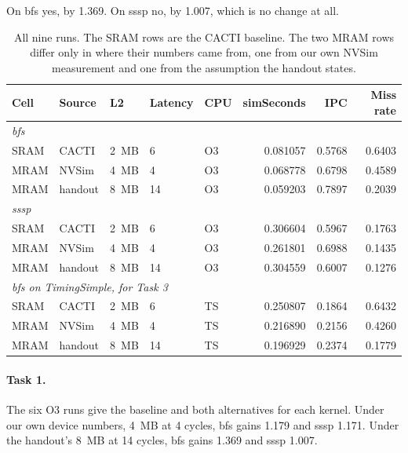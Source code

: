 \documentclass[9pt,a4paper]{extarticle}
\begin{document}
On bfs yes, by \SI{1.369}{\times}. On sssp no, by \SI{1.007}{\times},
which is no change at all.
\begin{table}[!ht]\centering\small
\caption{All nine runs. The SRAM rows are the CACTI baseline. The two MRAM
rows differ only in where their numbers came from, one from our own NVSim
measurement and one from the assumption the handout states.}
\label{tab:e}
\begin{tabular}{|l|l|l|l|l|r|r|r|}
\hline
Cell & Source & L2 & Latency & CPU & simSeconds & IPC & Miss rate \\
\hline
\multicolumn{8}{|l|}{\emph{bfs}} \\
\hline
SRAM & CACTI & \SI{2}{MB} & 6 & O3 & 0.081057 & 0.5768 & 0.6403 \\
\hline
MRAM & NVSim & \SI{4}{MB} & 4 & O3 & 0.068778 & 0.6798 & 0.4589 \\
\hline
MRAM & handout & \SI{8}{MB} & 14 & O3 & 0.059203 & 0.7897 & 0.2039 \\
\hline
\multicolumn{8}{|l|}{\emph{sssp}} \\
\hline
SRAM & CACTI & \SI{2}{MB} & 6 & O3 & 0.306604 & 0.5967 & 0.1763 \\
\hline
MRAM & NVSim & \SI{4}{MB} & 4 & O3 & 0.261801 & 0.6988 & 0.1435 \\
\hline
MRAM & handout & \SI{8}{MB} & 14 & O3 & 0.304559 & 0.6007 & 0.1276 \\
\hline
\multicolumn{8}{|l|}{\emph{bfs on TimingSimple, for Task 3}} \\
\hline
SRAM & CACTI & \SI{2}{MB} & 6 & TS & 0.250807 & 0.1864 & 0.6432 \\
\hline
MRAM & NVSim & \SI{4}{MB} & 4 & TS & 0.216890 & 0.2156 & 0.4260 \\
\hline
MRAM & handout & \SI{8}{MB} & 14 & TS & 0.196929 & 0.2374 & 0.1779 \\
\hline
\end{tabular}
\end{table}

\paragraph{Task 1.}

The six O3 runs give the baseline and both alternatives for each kernel.
Under our own device numbers, \SI{4}{MB} at 4 cycles, bfs gains
\SI{1.179}{\times} and sssp \SI{1.171}{\times}. Under the handout's
\SI{8}{MB} at 14 cycles, bfs gains \SI{1.369}{\times} and sssp
\SI{1.007}{\times}.
\end{document}
